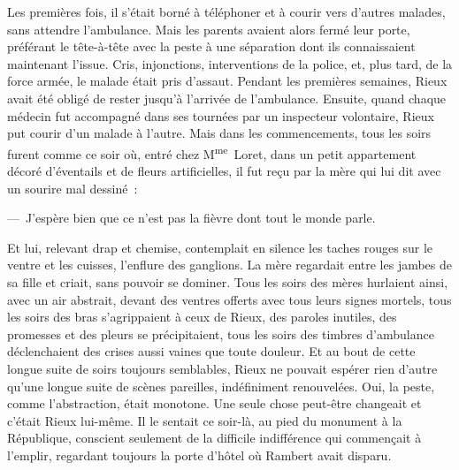 \documentclass[french,twoside]{book} %
\begin{document}
Les premières fois, il s’était borné à téléphoner et à courir vers d’autres malades, sans attendre l’ambulance. Mais les parents avaient alors fermé leur porte, préférant le tête-à-tête avec la peste à une séparation dont ils connaissaient maintenant l’issue. Cris, injonctions, interventions de la police, et, plus tard, de la force armée, le malade était pris d’assaut. Pendant les premières semaines, Rieux avait été obligé de rester jusqu’à l’arrivée de l’ambulance. Ensuite, quand chaque médecin fut accompagné dans ses tournées par un inspecteur volontaire, Rieux put courir d’un malade à l’autre. Mais dans les commencements, tous les soirs furent comme ce soir où, entré chez M\textsuperscript{me} Loret, dans un petit appartement décoré d’éventails et de fleurs artificielles, il fut reçu par la mère qui lui dit avec un sourire mal dessiné :\par
— J’espère bien que ce n’est pas la fièvre dont tout le monde parle.\par
Et lui, relevant drap et chemise, contemplait en silence les taches rouges sur le ventre et les cuisses, l’enflure des ganglions. La mère regardait entre les jambes de sa fille et criait, sans pouvoir se dominer. Tous les soirs des mères hurlaient ainsi, avec un air abstrait, devant des ventres offerts avec tous leurs signes mortels, tous les soirs des bras s’agrippaient à ceux de Rieux, des paroles inutiles, des promesses et des pleurs se précipitaient, tous les soirs des timbres d’ambulance déclenchaient des crises aussi vaines que toute douleur. Et au bout de cette longue suite de soirs toujours semblables, Rieux ne pouvait espérer rien d’autre qu’une longue suite de scènes pareilles, indéfiniment renouvelées. Oui, la peste, comme l’abstraction, était monotone. Une seule chose peut-être changeait et c’était Rieux lui-même. Il le sentait ce soir-là, au pied du monument à la République, conscient seulement de la difficile indifférence qui commençait à l’emplir, regardant toujours la porte d’hôtel où Rambert avait disparu.\par
\end{document}
